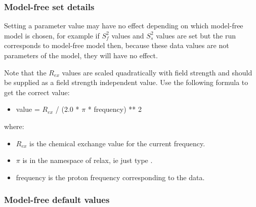 \subsubsection{Model-free set details}

Setting a parameter value may have no effect depending on which model-free model is chosen,
for example if $S^2_f$ values and $S^2_s$ values are set but the run corresponds to model-free model
 then, because these data values are not parameters of the model, they will have no
effect.

Note that the $R_{ex}$ values are scaled quadratically with field strength and should be supplied
as a field strength independent value.  Use the following formula to get the correct value:

\begin{itemize}
\item[]     value = $R_{ex}$ / (2.0 * $\pi$ * frequency) ** 2
\end{itemize}

where:
\begin{itemize}
\item[]     $R_{ex}$ is the chemical exchange value for the current frequency.
\item[]     $\pi$ is in the namespace of relax, ie just type 
.
\item[]     frequency is the proton frequency corresponding to the data.
\end{itemize}


\subsubsection{Model-free default values}



